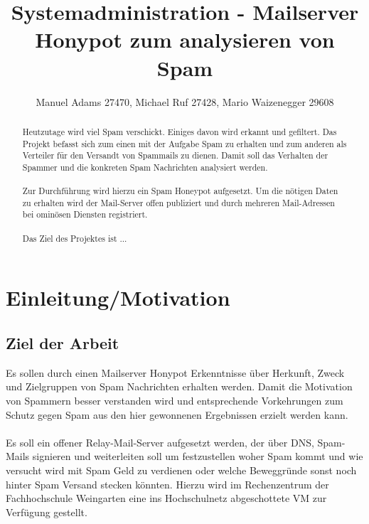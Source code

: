 \documentclass[a4paper,11pt,singlespacing]{article}
\begin{document}

\title{Systemadministration - Mailserver Honypot zum analysieren von Spam}
\author{Manuel Adams 27470, Michael Ruf 27428, Mario Waizenegger 29608}
\maketitle
\begin{abstract}
Heutzutage wird viel Spam verschickt. Einiges davon wird erkannt und gefiltert.
Das Projekt befasst sich zum einen mit der Aufgabe Spam zu erhalten und zum anderen als Verteiler für den Versandt von Spammails zu dienen.
Damit soll das Verhalten der Spammer und die konkreten Spam Nachrichten analysiert werden.
\\\\
Zur Durchführung wird hierzu ein Spam Honeypot aufgesetzt.
Um die nötigen Daten zu erhalten wird der Mail-Server offen publiziert und durch mehreren Mail-Adressen bei ominösen Diensten registriert.
\\\\
Das Ziel des Projektes ist ...\color{red}{TODO}
\end{abstract}

\newpage

\tableofcontents

\newpage
{}

\section{Einleitung/Motivation}\label{sec:Einleitung}

	\subsection{Ziel der Arbeit}\label{sec:Ziel}
		Es sollen durch einen Mailserver Honypot Erkenntnisse über Herkunft, Zweck und Zielgruppen von Spam Nachrichten erhalten werden.
		Damit die Motivation von Spammern besser verstanden wird und entsprechende Vorkehrungen zum Schutz gegen Spam aus den hier gewonnenen Ergebnissen erzielt werden kann.
\\\\
		Es soll ein offener Relay-Mail-Server aufgesetzt werden, der über DNS, Spam-Mails signieren und weiterleiten soll um festzustellen woher Spam kommt und wie versucht wird mit Spam Geld zu verdienen oder welche Beweggründe sonst noch hinter Spam Versand stecken könnten. 
		Hierzu wird im Rechenzentrum der Fachhochschule Weingarten eine ins Hochschulnetz abgeschottete VM zur Verfügung gestellt.
\end{document}
